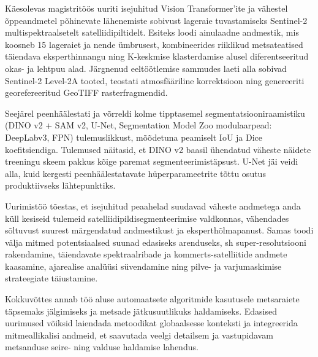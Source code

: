 Käesolevas magistritöös uuriti isejuhitud Vision Transformer'ite ja vähestel
õppeandmetel põhinevate lähenemiste sobivust lageraie tuvastamiseks Sentinel-2
multispektraalsetelt satelliidipiltidelt. Esiteks loodi ainulaadne andmestik,
mis koosneb 15 lageraiet ja nende ümbrusest, kombineerides riiklikud
metsateatised täiendava eksperthinnangu ning K-keskmise klasterdamise alusel
diferentseeritud okas- ja lehtpuu alad. Järgnenud eeltöötlemise sammudes laeti
alla sobivad Sentinel-2 Level-2A tooted, teostati atmosfääriline korrektsioon
ning genereeriti georefereeritud GeoTIFF rasterfragmendid.

Seejärel peenhäälestati ja võrreldi kolme tipptasemel segmentatsiooniraamistiku
(DINO v2 + SAM v2, U-Net, Segmentation Model Zoo modulaarpead: DeepLabv3, FPN)
tulemuslikkust, mõõdetuna peamiselt IoU ja Dice koefitsiendiga. Tulemused
näitasid, et DINO v2 baasil ühendatud väheste näidete treeningu skeem
pakkus kõige paremat segmenteerimistäpsust. U-Net jäi veidi alla, kuid
kergesti peenhäälestatavate hüperparameetrite tõttu osutus produktiivseks
lähtepunktiks.

Uurimistöö tõestas, et isejuhitud peaahelad suudavad väheste andmetega anda
küll kesiseid tulemeid satelliidipildisegmenteerimise valdkonnas,
vähendades sõltuvust suurest märgendatud andmestikust ja eksperthõlmapanust.
Samas toodi välja mitmed potentsiaalsed suunad edasiseks arenduseks, sh
super-resolutsiooni rakendamine, täiendavate spektraalribade ja
kommerts-satelliitide andmete kaasamine, ajarealise analüüsi süvendamine ning
pilve- ja varjumaskimise strateegiate täiustamine.

Kokkuvõttes annab töö aluse automaatsete algoritmide kasutusele metsaraiete
täpsemaks jälgimiseks ja metsade jätkusuutlikuks haldamiseks. Edasised uurimused
võiksid laiendada metoodikat globaalsesse konteksti ja integreerida
mitmeallikalisi andmeid, et saavutada veelgi detailsem ja vastupidavam
metsanduse seire- ning valduse haldamise lahendus.
